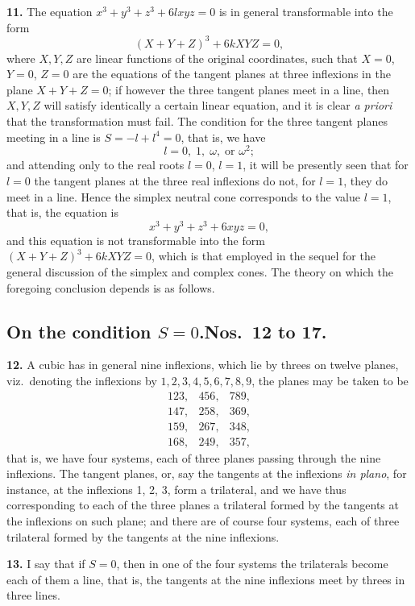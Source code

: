 \documentclass[11pt,a4paper]{article}
\begin{document}
\textbf{11.} The equation $x^{3} + y^{3} + z^{3} + 6lxyz = 0$ is in general transformable into the form
\[
(X + Y + Z)^{3} + 6kXYZ = 0,
\]
where $X, Y, Z$ are linear functions of the original coordinates, such that $X = 0$, $Y = 0$, $Z = 0$ are the equations of the tangent planes at three inflexions in the plane $X + Y + Z = 0$; if however the three tangent planes meet in a line, then $X, Y, Z$ will satisfy identically a certain linear equation, and it is clear \textit{a priori} that the transformation must fail. The condition for the three tangent planes meeting in a line is $S = -l + l^{4} = 0$, that is, we have
\[
l = 0,\; 1,\; \omega,\; \text{or } \omega^{2};
\]
and attending only to the real roots $l = 0$, $l = 1$, it will be presently seen that for $l = 0$ the tangent planes at the three real inflexions do not, for $l = 1$, they do meet in a line. Hence the simplex neutral cone corresponds to the value $l = 1$, that is, the equation is
\[
x^{3} + y^{3} + z^{3} + 6xyz = 0,
\]
and this equation is not transformable into the form $(X + Y + Z)^{3} + 6kXYZ = 0$, which is that employed in the sequel for the general discussion of the simplex and complex cones. The theory on which the foregoing conclusion depends is as follows.

\subsection*{On the condition $S = 0$.\quad Nos.\ 12 to 17.}

\textbf{12.} A cubic has in general nine inflexions, which lie by threes on twelve planes, viz.\ denoting the inflexions by $1, 2, 3, 4, 5, 6, 7, 8, 9$, the planes may be taken to be
\[
\begin{array}{ccc}
123, & 456, & 789,\\
147, & 258, & 369,\\
159, & 267, & 348,\\
168, & 249, & 357,
\end{array}
\]
that is, we have four systems, each of three planes passing through the nine inflexions. The tangent planes, or, say the tangents at the inflexions \textit{in plano}, for instance, at the inflexions 1, 2, 3, form a trilateral, and we have thus corresponding to each of the three planes a trilateral formed by the tangents at the inflexions on such plane; and there are of course four systems, each of three trilateral formed by the tangents at the nine inflexions.

\textbf{13.} I say that if $S = 0$, then in one of the four systems the trilaterals become each of them a line, that is, the tangents at the nine inflexions meet by threes in three lines.
\end{document}
